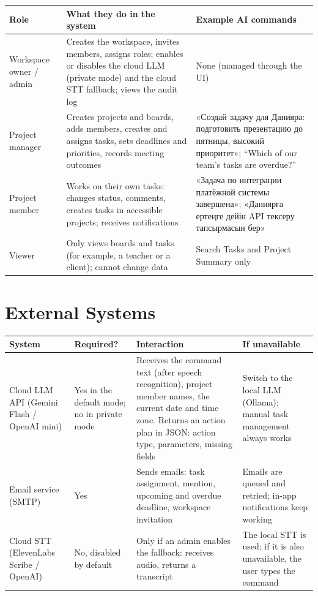 \documentclass[11pt,a4paper]{article}
\newcommand{\tblstart}{\small\rowcolors{2}{gray!7}{white}}
\begin{document}
{\tblstart
\begin{xltabular}{\textwidth}{P{3.1cm} L L}
\toprule
\textbf{Role} & \textbf{What they do in the system} & \textbf{Example AI commands} \\
\midrule
\endhead
Workspace owner / admin & Creates the workspace, invites members, assigns roles; enables or disables the cloud LLM (private mode) and the cloud STT fallback; views the audit log & None (managed through the UI) \\
Project manager & Creates projects and boards, adds members, creates and assigns tasks, sets deadlines and priorities, records meeting outcomes & «Создай задачу для Данияра: подготовить презентацию до пятницы, высокий приоритет»; “Which of our team's tasks are overdue?” \\
Project member & Works on their own tasks: changes status, comments, creates tasks in accessible projects; receives notifications & «Задача по интеграции платёжной системы завершена»; «Даниярға ертеңге дейін API тексеру тапсырмасын бер» \\
Viewer & Only views boards and tasks (for example, a teacher or a client); cannot change data & Search Tasks and Project Summary only \\
\bottomrule
\end{xltabular}}

\section{External Systems}

{\tblstart
\begin{xltabular}{\textwidth}{P{2.8cm} P{2.4cm} L P{3.2cm}}
\toprule
\textbf{System} & \textbf{Required?} & \textbf{Interaction} & \textbf{If unavailable} \\
\midrule
\endhead
Cloud LLM API (Gemini Flash / OpenAI mini) & Yes in the default mode; no in private mode & Receives the command text (after speech recognition), project member names, the current date and time zone. Returns an action plan in JSON: action type, parameters, missing fields & Switch to the local LLM (Ollama); manual task management always works \\
Email service (SMTP) & Yes & Sends emails: task assignment, mention, upcoming and overdue deadline, workspace invitation & Emails are queued and retried; in-app notifications keep working \\
Cloud STT (ElevenLabs Scribe / OpenAI) & No, disabled by default & Only if an admin enables the fallback: receives audio, returns a transcript & The local STT is used; if it is also unavailable, the user types the command \\
\bottomrule
\end{xltabular}}
\end{document}
